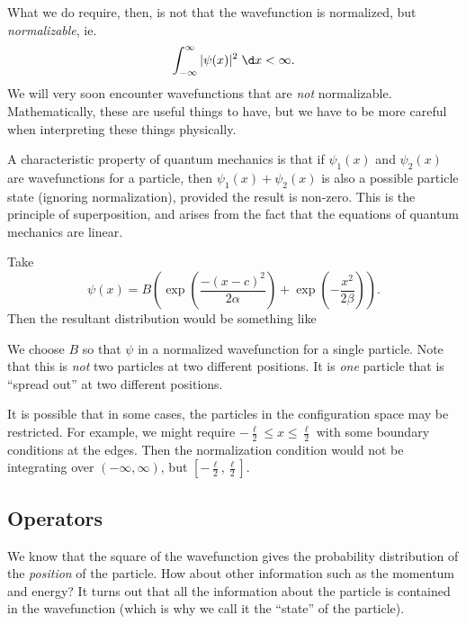 \documentclass[a4paper]{article}
\begin{document}
What we do require, then, is not that the wavefunction is normalized, but \emph{normalizable}, ie.
\[
  \int_{-\infty}^\infty |\psi(x)|^2 \;\d x < \infty.
\]
We will very soon encounter wavefunctions that are \emph{not} normalizable. Mathematically, these are useful things to have, but we have to be more careful when interpreting these things physically.

A characteristic property of quantum mechanics is that if $\psi_1(x)$ and $\psi_2(x)$ are wavefunctions for a particle, then $\psi_1(x) + \psi_2 (x)$ is also a possible particle state (ignoring normalization), provided the result is non-zero. This is the principle of superposition, and arises from the fact that the equations of quantum mechanics are linear.

\begin{eg}
  Take
  \[
    \psi(x) = B\left(\exp\left(\frac{-(x - c)^2}{2\alpha}\right) + \exp\left(-\frac{x^2}{2\beta}\right)\right).
  \]
  Then the resultant distribution would be something like
  \begin{center}
  \end{center}
  We choose $B$ so that $\psi$ in a normalized wavefunction for a single particle. Note that this is \emph{not} two particles at two different positions. It is \emph{one} particle that is ``spread out'' at two different positions.
\end{eg}
It is possible that in some cases, the particles in the configuration space may be restricted. For example, we might require $ -\frac{\ell}{2} \leq x \leq \frac{\ell}{2}$ with some boundary conditions at the edges. Then the normalization condition would not be integrating over $(-\infty, \infty)$, but $[-\frac{\ell}{2}, \frac{\ell}{2}]$.

\subsection{Operators}
We know that the square of the wavefunction gives the probability distribution of the \emph{position} of the particle. How about other information such as the momentum and energy? It turns out that all the information about the particle is contained in the wavefunction (which is why we call it the ``state'' of the particle).
\end{document}
